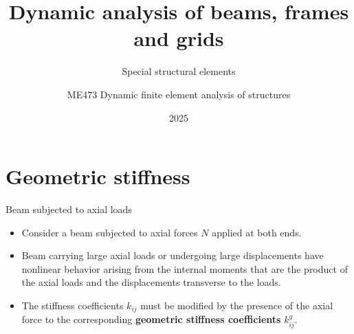 \documentclass[aspectratio=169]{beamer}
\title{Dynamic analysis of beams, frames and grids}
\subtitle{Special structural elements}
\author{ME473 Dynamic finite element analysis of structures}
\institute{Stefano Burzio}
\date{2025}
\begin{document}
\usenavigationsymbolstemplate{}

\section{Geometric stiffness}

\begin{frame}{Beam subjected to axial loads}
  \begin{itemize}
    \item Consider a beam subjected to axial forces $N$ applied at both ends.
  \end{itemize}
  \begin{center}
  \end{center}
  \begin{itemize}
    \item Beam carrying large axial loads or undergoing large displacements have nonlinear behavior arising from the internal moments that are the product of the axial loads and the displacements transverse to the loads.
    \item The stiffness coefficients $k_{ij}$ must be modified by the presence of the axial force to the corresponding \textbf{geometric stiffness coefficients} $k^g_{ij}$.
  \end{itemize}
\end{frame}
\end{document}
